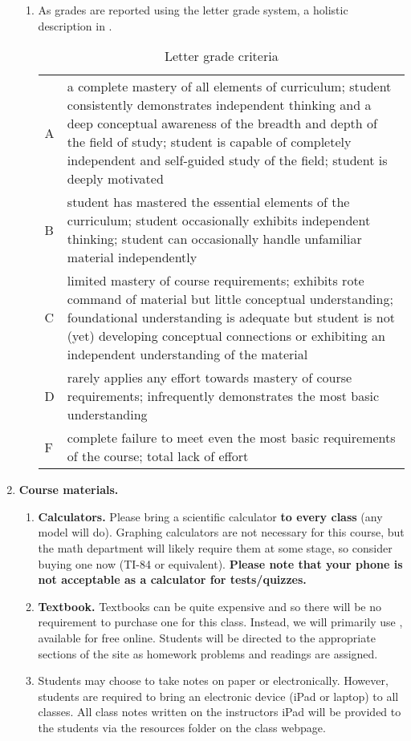 \documentclass{article}
\begin{document}
\begin{enumerate}
\begin{enumerate}
\item As grades are reported using the letter grade system, a holistic description in .
\begin{table}[h]
\caption{Letter grade criteria}
\label{tab:grades}
\begin{center}
\small
\begin{tabular}{lp{4in}}
\toprule
A & a complete mastery of all elements of curriculum; student consistently demonstrates independent thinking and a deep conceptual awareness of the breadth and depth of the field of study; student is capable of completely independent and self-guided study of the field; student is deeply motivated \\
B & student has mastered the essential elements of the curriculum; student occasionally exhibits independent thinking; student can occasionally handle unfamiliar material independently \\
C & limited mastery of course requirements; exhibits rote command of material but little conceptual understanding; foundational understanding is adequate but student is not (yet) developing conceptual connections or exhibiting an independent
understanding of the material \\
D & rarely applies any effort towards mastery of course requirements; infrequently demonstrates the most basic understanding\\
F & complete failure to meet even the most basic requirements of the course; total lack of effort \\
\bottomrule
\end{tabular}
\end{center}
\end{table}
\end{enumerate}

\item \textbf{Course materials.}
\begin{enumerate}
\item \textbf{Calculators.}  Please bring a scientific calculator \textbf{to every class} (any model will do). Graphing calculators are not necessary for this course, but the math department will likely require them at some stage, so consider buying one now (TI-84 or equivalent). \textbf{Please note that your phone is not acceptable as a calculator for tests/quizzes.}

\item \textbf{Textbook.} Textbooks can be quite expensive and so there will be no requirement to purchase one for this class. Instead, we will primarily use , available for free online. Students will be directed to the appropriate sections of the site as homework problems and readings are assigned.
\item Students may choose to take notes on paper or electronically. However, students are required to bring an electronic device (iPad or laptop) to all classes. All class notes written on the instructors iPad will be provided to the students via the resources folder on the class webpage.
\end{enumerate}


\end{enumerate}
\end{document}
